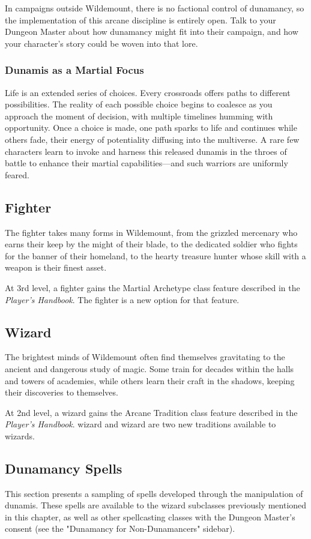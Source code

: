 \documentclass[10pt,a4paper,twoside,bg=print,twocolumn,openany,nodeprecatedcode]{dndbook}
\begin{document}
In campaigns outside Wildemount, there is no factional control of dunamancy, so the implementation of this arcane discipline is entirely open. Talk to your Dungeon Master about how dunamancy might fit into their campaign, and how your character's story could be woven into that lore.

\subsubsection{Dunamis as a Martial Focus}
Life is an extended series of choices. Every crossroads offers paths to different possibilities. The reality of each possible choice begins to coalesce as you approach the moment of decision, with multiple timelines humming with opportunity. Once a choice is made, one path sparks to life and continues while others fade, their energy of potentiality diffusing into the multiverse. A rare few characters learn to invoke and harness this released dunamis in the throes of battle to enhance their martial capabilities—and such warriors are uniformly feared.

\subsection{Fighter}
The fighter takes many forms in Wildemount, from the grizzled mercenary who earns their keep by the might of their blade, to the dedicated soldier who fights for the banner of their homeland, to the hearty treasure hunter whose skill with a weapon is their finest asset.

At 3rd level, a fighter gains the Martial Archetype class feature described in the \textit{Player's Handbook}. The fighter is a new option for that feature.

\subsection{Wizard}
The brightest minds of Wildemount often find themselves gravitating to the ancient and dangerous study of magic. Some train for decades within the halls and towers of academies, while others learn their craft in the shadows, keeping their discoveries to themselves.

At 2nd level, a wizard gains the Arcane Tradition class feature described in the \textit{Player's Handbook}. wizard and wizard are two new traditions available to wizards.

\subsection{Dunamancy Spells}
This section presents a sampling of spells developed through the manipulation of dunamis. These spells are available to the wizard subclasses previously mentioned in this chapter, as well as other spellcasting classes with the Dungeon Master's consent (see the "Dunamancy for Non-Dunamancers" sidebar).
\end{document}
